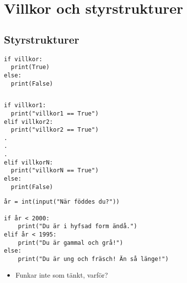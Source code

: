 \section{Villkor och styrstrukturer}

\subsection{Styrstrukturer}

\begin{frame}[fragile]
  \begin{verbatim}
if villkor:
  print(True)
else:
  print(False)
  \end{verbatim}
\end{frame}

\begin{frame}[fragile]
  \begin{example}
    \inputminted[linenos]{python}{examples/birthyear.py}
  \end{example}
\end{frame}

\begin{frame}[fragile]
  \begin{verbatim}
if villkor1:
  print("villkor1 == True")
elif villkor2:
  print("villkor2 == True")
.
.
.
elif villkorN:
  print("villkorN == True")
else:
  print(False)
  \end{verbatim}
\end{frame}

\begin{frame}[fragile]
  \begin{example}
    \begin{verbatim}
år = int(input("När föddes du?"))

if år < 2000:
    print("Du är i hyfsad form ändå.")
elif år < 1995:
    print("Du är gammal och grå!")
else:
    print("Du är ung och fräsch! Än så länge!")
    \end{verbatim}
  \end{example}

  \pause

  \begin{question}
    \begin{itemize}
      \item Funkar inte som tänkt, varför?
    \end{itemize}
  \end{question}
\end{frame}

